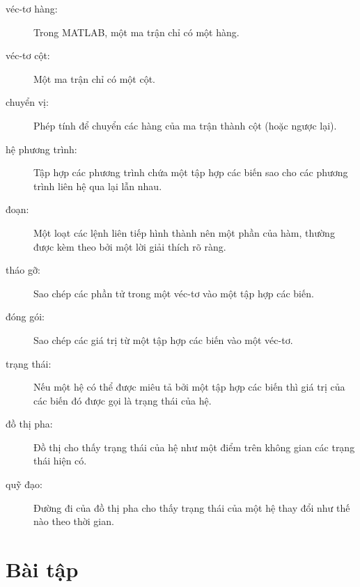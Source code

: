 \documentclass[12pt]{book}
\begin{document}
\begin{description}

\item[véc-tơ hàng:] Trong MATLAB, một ma trận chỉ có một hàng.

\item[véc-tơ cột:] Một ma trận chỉ có một cột. 

\item[chuyển vị:] Phép tính để chuyển các hàng của ma trận thành
cột (hoặc ngược lại).

\item[hệ phương trình:] Tập hợp các phương trình chứa một tập hợp
các biến sao cho các phương trình liên hệ qua lại lẫn nhau.

\item[đoạn:] Một loạt các lệnh liên tiếp hình thành nên một phần của
hàm, thường được kèm theo bởi một lời giải thích rõ ràng.

\item[tháo gỡ:] Sao chép các phần tử trong một véc-tơ vào một 
tập hợp các biến.

\item[đóng gói:] Sao chép các giá trị từ một tập hợp các biến vào
một véc-tơ.

\item[trạng thái:] Nếu một hệ có thể được miêu tả bởi một tập hợp 
các biến thì giá trị của các biến đó được gọi là trạng thái của hệ.

\item[đồ thị pha:] Đồ thị cho thấy trạng thái của hệ như một điểm
trên không gian các trạng thái hiện có.

\item[quỹ đạo:] Đường đi của đồ thị pha cho thấy trạng thái của
một hệ thay đổi như thế nào theo thời gian.


\end{description}

\section{Bài tập}
\end{document}
